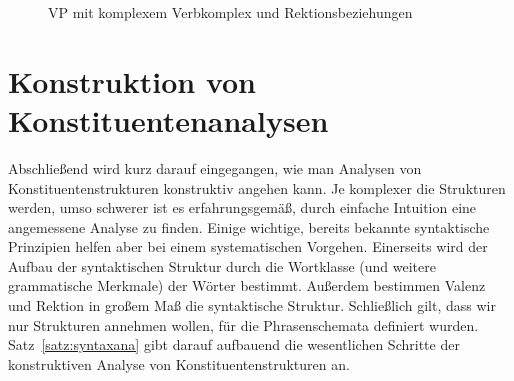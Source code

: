 \begin{figure}[!htbp]
  \centering
  \caption{VP mit komplexem Verbkomplex und Rektionsbeziehungen}
  \label{fig:vkrekext}
\end{figure}





\section{Konstruktion von Konstituentenanalysen}

\label{sec:syntaxana}

Abschließend wird kurz darauf eingegangen, wie man Analysen von Konstituentenstrukturen konstruktiv angehen kann.
Je komplexer die Strukturen werden, umso schwerer ist es erfahrungsgemäß, durch einfache Intuition eine angemessene Analyse zu finden.
Einige wichtige, bereits bekannte syntaktische Prinzipien helfen aber bei einem systematischen Vorgehen.
Einerseits wird der Aufbau der syntaktischen Struktur durch die Wortklasse (und weitere grammatische Merkmale) der Wörter bestimmt.
Außerdem bestimmen Valenz und Rektion in großem Maß die syntaktische Struktur.
Schließlich gilt, dass wir nur Strukturen annehmen wollen, für die Phrasenschemata definiert wurden.
Satz~\ref{satz:syntaxana} gibt darauf aufbauend die wesentlichen Schritte der konstruktiven Analyse von Konstituentenstrukturen an.

